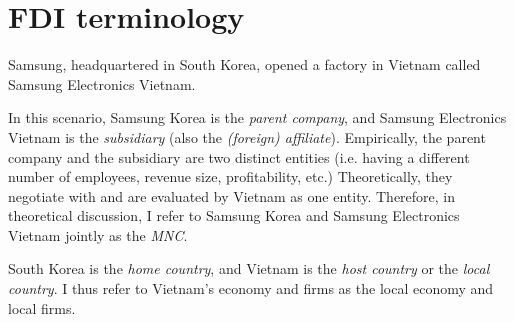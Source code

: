 \chapter{FDI terminology}

Samsung, headquartered in South Korea, opened a factory in Vietnam called
Samsung Electronics Vietnam.

In this scenario, Samsung Korea is the \textit{parent company}, and Samsung Electronics Vietnam is the
\textit{subsidiary} (also the \textit{(foreign) affiliate}). Empirically, the parent company and the
subsidiary are two distinct entities (i.e. having a different number of
employees, revenue size, profitability, etc.) Theoretically, they negotiate with
and are evaluated by Vietnam as one entity. Therefore, in theoretical
discussion, I refer to Samsung Korea and Samsung Electronics Vietnam jointly as
the \textit{MNC}.

South Korea is the \textit{home country}, and Vietnam is the \textit{host
  country} or the \textit{local country}. I thus refer to Vietnam's economy and firms as the local economy and local firms.


